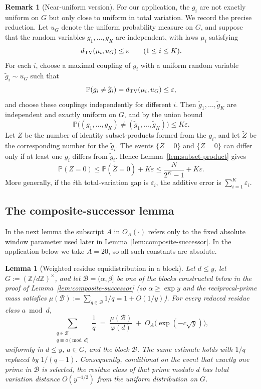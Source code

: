 \documentclass[11pt,reqno]{amsart}
\theoremstyle{plain}
\newtheorem{lemma}[theorem]{Lemma}
\theoremstyle{definition}
\newtheorem{remark}[theorem]{Remark}
\newcommand{\ZZ}{\mathbb{Z}}
\newcommand{\PP}{\mathbb{P}}
\newcommand{\eps}{\varepsilon}
\begin{document}
\begin{remark}[Near-uniform version]\label{rem:near-uniform}
For our application, the $g_i$ are not exactly uniform on $G$ but only close to
uniform in total variation. We record the precise reduction. Let $u_G$ denote
the uniform probability measure on $G$, and suppose that the random variables
$g_1,\dots,g_K$ are independent, with laws $\mu_i$ satisfying
\[
d_{\rm TV}(\mu_i,u_G)\le \eps \qquad (1\le i\le K).
\]
For each $i$, choose a maximal coupling of $g_i$ with a uniform random variable
$\widetilde g_i\sim u_G$ such that
\[
\PP(g_i\ne \widetilde g_i)=d_{\rm TV}(\mu_i,u_G)\le \eps,
\]
and choose these couplings independently for different $i$. Then
$\widetilde g_1,\dots,\widetilde g_K$ are independent and exactly uniform on
$G$, and by the union bound
\[
\PP\bigl((g_1,\dots,g_K)\ne(\widetilde g_1,\dots,\widetilde g_K)\bigr)
\le K\eps.
\]
Let $Z$ be the number of identity subset-products formed from the $g_i$, and
let $\widetilde Z$ be the corresponding number for the $\widetilde g_i$. The
events $\{Z=0\}$ and $\{\widetilde Z=0\}$ can differ only if at least one
$g_i$ differs from $\widetilde g_i$. Hence Lemma~\ref{lem:subset-product} gives
\begin{equation}\label{eq:PZzero-perturbed}
\PP(Z=0)
\le
\PP(\widetilde Z=0)+K\eps
\le
\frac{N}{2^K-1}+K\eps.
\end{equation}
More generally, if the $i$th total-variation gap is $\eps_i$, the additive
error is $\sum_{i=1}^K \eps_i$.
\end{remark}

\subsection{The composite-successor lemma}

In the next lemma the subscript $A$ in $O_A(\cdot)$ refers only to the fixed
absolute window parameter used later in Lemma~\ref{lem:composite-successor}.
In the application below we take $A=20$, so all such constants are absolute.

\begin{lemma}[Weighted residue equidistribution in a block]\label{lem:block-eq}
Let $d\le y$, let $G:=(\ZZ/d\ZZ)^\times$, and let
$\mathcal{B}=(\alpha,\beta]$ be one of the blocks constructed below in the
proof of Lemma~\ref{lem:composite-successor} (so $\alpha\ge\exp y$ and the
reciprocal-prime mass satisfies $\mu(\mathcal{B}):=\sum_{q\in\mathcal{B}}1/q
=1+O(1/y)$). For every reduced residue class $a\bmod d$,
\[
\sum_{\substack{q\in\mathcal{B}\\q\equiv a\pmod d}}\frac1q
\;=\;
\frac{\mu(\mathcal{B})}{\varphi(d)}
\;+\;
O_A\!\bigl(\exp(-c\sqrt y)\bigr),
\]
uniformly in $d\le y$, $a\in G$, and the block $\mathcal{B}$. The same
estimate holds with $1/q$ replaced by $1/(q-1)$. Consequently, conditional
on the event that exactly one prime in $\mathcal{B}$ is selected, the residue
class of that prime modulo $d$ has total variation distance
$O(y^{-1/2})$ from the uniform distribution on $G$.
\end{lemma}
\end{document}
